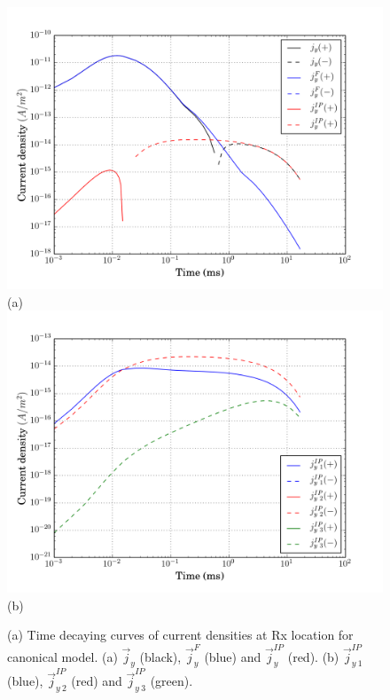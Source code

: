 \documentclass[a4paper, 11pt]{article}
\renewcommand {\j}  { {\vec j} }
\begin{document}
\begin{figure}[htb]
  \centering
  \includegraphics[height=0.4\textheight]{figures/synthetic/CurrentIP_case1_decay.png} \\
  (a) \\
  \includegraphics[height=0.4\textheight]{figures/synthetic/CurrentIP_decay_case1_2.png} \\
  (b)
  \caption{(a) Time decaying curves of current densities at Rx location for canonical model. (a) $\j_y$ (black), $\j^F_y$ (blue) and $\j^{IP}_y$ (red). (b) $\j^{IP}_{y \ 1}$ (blue), $\j^{IP}_{y \ 2}$ (red) and $\j^{IP}_{y \ 3}$ (green).}
  \label{F: currentEMIP_case1_decay}
\end{figure}
\end{document}
